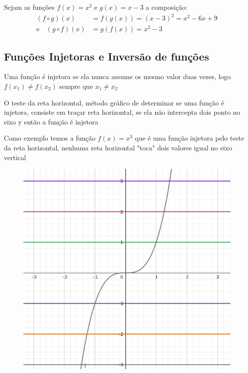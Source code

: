 \begin{multicols*}{2}
    Sejam as funções $f(x) = x^2$ e $g(x) = x -3 $ a composição:
    \begin{align*}
        (f \circ g)(x) &= f(g(x)) = (x-3)^2 = x^2 -6x + 9\\
        \text{e}\quad (g \circ f)(x) &= g(f(x)) = x^2 - 3
    \end{align*}

    \subsection*{Funções Injetoras e Inversão de funções}
    Uma função é injetora se ela nunca assume os mesmo valor duas vezes, logo $f(x_1) \ne f(x_2)$ 			sempre que $x_1 \ne x_2$

    \begin{theorem}
        O teste da reta horizontal, método gráfico de determinar se uma função é injetora, consiste em 			traçar reta horizontal, se ela não intercepta dois ponto no eixo y então a função é injetora
    \end{theorem}

    Como exemplo temos a função $f(x) = x^3$ que é uma função injetora pelo teste da reta 					horizontal, nenhuma reta horizontal "toca" dois valores igual no eixo vertical
    \begin{figure}[H]
        \centering
        \includegraphics[scale=0.3]{assets/rafael/img37.png}
    \end{figure}


\end{multicols*}
